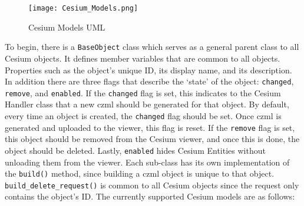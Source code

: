 \begin{figure} 
    \centering
    \texttt{[image: Cesium\_Models.png]} 
    \caption{Cesium Models UML} 
    \label{fig:cesium_models} 
\end{figure}

To begin, there is a \texttt{BaseObject} class which serves as a general parent
class to all Cesium objects. It defines member variables that are common to all
objects. Properties such as the object's unique ID, its display name, and its
description. In addition there are three flags that describe the `state' of the
object: \texttt{changed}, \texttt{remove}, and \texttt{enabled}. If the
\texttt{changed} flag is set, this indicates to the Cesium Handler class that a
new \gls{czml} should be generated for that object. By default, every time an
object is created, the \texttt{changed} flag should be set. Once \gls{czml} is
generated and uploaded to the viewer, this flag is reset. If the
\texttt{remove} flag is set, this object should be removed from the Cesium
viewer, and once this is done, the object should be deleted. Lastly,
\texttt{enabled} hides Cesium Entities without unloading them from the viewer.
Each sub-class has its own implementation of the \texttt{build()} method, since
building a \gls{czml} object is unique to that object.
\texttt{build\_delete\_request()} is common to all Cesium objects since the
request only contains the object's ID. The currently supported Cesium models
are as follows:

